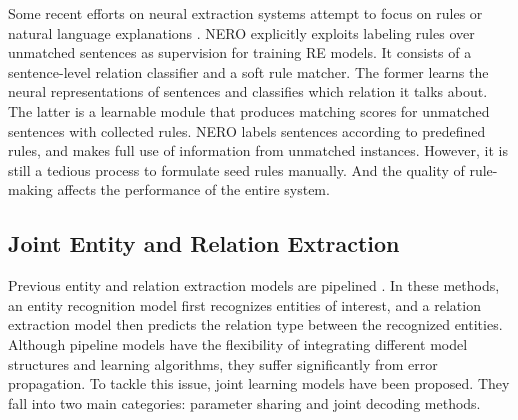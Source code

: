 \documentclass[sigconf]{acmart}
\begin{document}
Some recent efforts on neural extraction systems attempt to focus on rules or natural language explanations \cite{wang2019learning}. NERO \cite{zhou2020nero} explicitly exploits labeling rules over unmatched sentences as supervision for training RE models. It consists of a sentence-level relation classifier and a soft rule matcher. The former learns the neural representations of sentences and classifies which relation it talks about. The latter is a learnable module that produces matching scores for unmatched sentences with collected rules. NERO labels sentences according to predefined rules, and makes full use of information from unmatched instances. However, it is still a tedious process to formulate seed rules manually. And the quality of rule-making affects the performance of the entire system.

\subsection{Joint Entity and Relation Extraction}


Previous entity and relation extraction models are pipelined \cite{chan2011exploiting, lin2016neural}. In these methods, an entity recognition model first recognizes entities of interest, and a relation extraction model then predicts the relation type between the recognized entities. Although pipeline models have the flexibility of integrating different model structures and learning algorithms, they suffer significantly from error propagation. To tackle this issue, joint learning models have been proposed. They fall into two main categories: parameter sharing and joint decoding methods.
\end{document}
